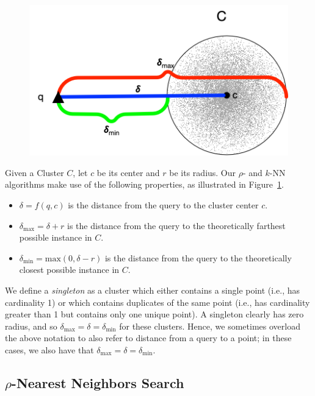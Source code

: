 \begin{figure}[ht!]
    \centering
    \includegraphics[scale=0.5]{images/geometry/deltas.png}
    \caption{}
    \label{fig:methods:deltas}
\end{figure}

Given a Cluster $C$, let $c$ be its center and $r$ be its radius. Our $\rho$- and $k$-NN algorithms make use of the following properties, as illustrated in Figure~\ref{fig:methods:deltas}.

\begin{itemize}
    \item $\delta = f(q, c)$ is the distance from the query to the cluster center $c$.
    \item $\delta_{\max} = \delta + r$ is the distance from the query to the theoretically farthest possible instance in $C$.
    \item $\delta_{\min} = \text{max}(0, \delta - r)$ is the distance from the query to the theoretically closest possible instance in $C$.
\end{itemize}

We define a \emph{singleton} as a cluster which either contains a single point (i.e., has cardinality 1) or which contains 
duplicates of the same point (i.e., has cardinality greater than 1 but contains only one unique point).
A singleton clearly has zero radius, and so $\delta_{\max} = \delta = \delta_{\min}$ for these clusters.
Hence, we sometimes overload the above notation to also refer to distance from a query to a point;
in these cases, we also have that $\delta_{\max} = \delta = \delta_{\min}$.


\subsection{\texorpdfstring{$\rho$}{p}-Nearest Neighbors Search}
\label{subsec:methods:rnn-search}


